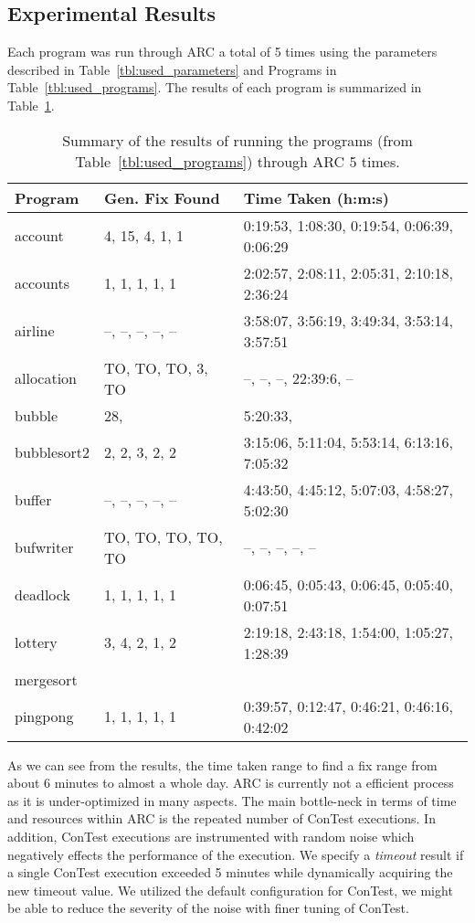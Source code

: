 \subsection{Experimental Results}
\label{sec:experimental_results}

Each program was run through ARC a total of 5 times using the parameters
described in Table~\ref{tbl:used_parameters} and Programs in
Table~\ref{tbl:used_programs}. The results of each program is summarized in
Table~\ref{tbl:summary_results}.

\begin{table}%
\caption{Summary of the results of running the programs
(from Table~\ref{tbl:used_programs}) through ARC 5 times.}
\begin{center}
\lstset{basicstyle=\scriptsize}
\begin{tabular}{|l|l|l|}
\hline
\textbf{Program} & \textbf{Gen. Fix Found} & \textbf{Time Taken (h:m:s)}\\
\hline
account & 4, 15, 4, 1, 1 & 0:19:53, 1:08:30, 0:19:54, 0:06:39, 0:06:29\\
\hline
accounts & 1, 1, 1, 1, 1 & 2:02:57, 2:08:11, 2:05:31, 2:10:18, 2:36:24\\
\hline
airline & --, --, --, --, -- & 3:58:07, 3:56:19, 3:49:34, 3:53:14, 3:57:51\\
\hline
allocation & TO, TO, TO, 3, TO & --, --, --, 22:39:6, --  \\
\hline
bubble & 28, & 5:20:33, \\
\hline
bubblesort2 & 2, 2, 3, 2, 2 & 3:15:06, 5:11:04, 5:53:14, 6:13:16, 7:05:32 \\
\hline
buffer & --, --, --, --, -- & 4:43:50, 4:45:12, 5:07:03, 4:58:27, 5:02:30\\
\hline
bufwriter & TO, TO, TO, TO, TO & --, --, --, --, --\\
\hline
deadlock & 1, 1, 1, 1, 1 & 0:06:45, 0:05:43, 0:06:45, 0:05:40, 0:07:51\\
\hline
lottery & 3, 4, 2, 1, 2 & 2:19:18, 2:43:18, 1:54:00, 1:05:27, 1:28:39\\
\hline
mergesort & & \\
\hline
pingpong & 1, 1, 1, 1, 1 & 0:39:57, 0:12:47, 0:46:21, 0:46:16, 0:42:02\\
\hline
\end{tabular}
\label{tbl:summary_results}
\end{center}
\end{table}

As we can see from the results, the time taken range to find a fix range from
about 6 minutes to almost a whole day. ARC is currently not a efficient process
as it is under-optimized in many aspects. The main bottle-neck in terms of time
and resources within ARC is the repeated number of ConTest executions. In
addition, ConTest executions are instrumented with random noise which
negatively effects the performance of the execution. We specify a
\textit{timeout} result if a single ConTest execution exceeded 5 minutes while
dynamically acquiring the new timeout value. We utilized the default
configuration for ConTest, we might be able to reduce the severity of the noise
with finer tuning of ConTest.

